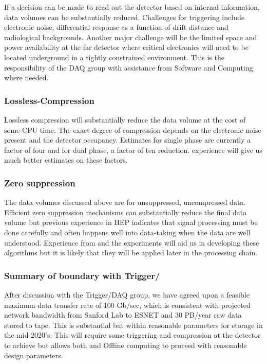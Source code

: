 \begin{enumerate}
If a decision can be made to read  out the detector based on internal information, data volumes can be substantially reduced.  
Challenges for triggering include electronic noise, differential response as a function of drift distance and radiological backgrounds.
Another major challenge will be the limited space and power availability at the far detector where critical electronics will need to be located underground in a tightly constrained environment.  This is the responsibility of the DAQ group with assistance from Software and Computing where needed. 

\subsubsection{Lossless-Compression}

Lossless compression will substantially reduce the data volume at the cost of some CPU time.  The exact degree of compression  depends on the electronic noise present and the detector occupancy.  Estimates for single phase are currently a factor of four and for dual phase, a factor of ten reduction.    experience will give us much better estimates on these factors.


\subsubsection{Zero suppression}

The data volumes discussed above are for unsuppressed, uncompressed data.  Efficient zero suppression mechanisms can substantially reduce the final data volume but previous experience in HEP indicates that signal processing must be done carefully and often happens well into data-taking when the data are well understood.  Experience from   and the  experiments will aid us in developing these algorithms but it is likely that they will be applied later in the processing chain.  

\subsubsection{Summary of boundary with Trigger/}

After discussion with the Trigger/DAQ group, we have agreed upon a feasible maximum data transfer rate of 100 Gb/sec, which is consistent with projected network bandwidth from Sanford Lab to ESNET and 30 PB/year raw data stored to tape.  This is substantial but within reasonable parameters for storage in the mid-2020's.  This will require some triggering and compression at the detector to achieve but allows both  and Offline computing to proceed with reasonable design parameters.


\end{enumerate}
